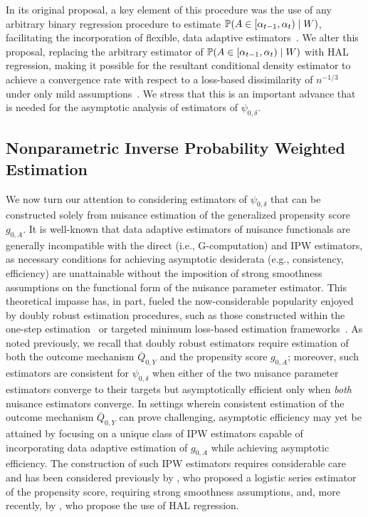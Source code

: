 In its original proposal, a key element of this procedure was the use of any
arbitrary binary regression procedure to estimate $\mathbb{P}(A \in [\alpha_{t-1},
\alpha_t) \mid W)$, facilitating the incorporation of flexible, data adaptive
estimators~\citep{diaz2011super}. We alter this proposal, replacing the
arbitrary estimator of $\mathbb{P}(A \in [\alpha_{t-1}, \alpha_t) \mid W)$ with HAL
regression, making it possible for the resultant conditional density estimator
to achieve a convergence rate with respect to a loss-based dissimilarity of
$n^{-1/3}$ under only mild assumptions~\citep{vdl2017generally, vdl2017uniform}.
We stress that this is an important advance that is needed for the asymptotic
analysis of estimators of $\psi_{0,\delta}$.

\subsection{Nonparametric Inverse Probability Weighted Estimation}\label{npipw}

We now turn our attention to considering estimators of $\psi_{0,\delta}$ that
can be constructed solely from nuisance estimation of the generalized propensity
score $g_{0,A}$. It is well-known that data adaptive estimators of nuisance
functionals are generally incompatible with the direct (i.e., G-computation) and
IPW estimators, as necessary conditions for achieving asymptotic desiderata
(e.g., consistency, efficiency) are unattainable without the imposition of
strong smoothness assumptions on the functional form of the nuisance parameter
estimator. This theoretical impasse has, in part, fueled the now-considerable
popularity enjoyed by doubly robust estimation procedures, such as those
constructed within the one-step estimation~\citep{bickel1993efficient} or
targeted minimum loss-based estimation frameworks~\citep{vdl2006targeted,
vdl2011targeted,vdl2018targeted}. As noted previously, we recall that doubly
robust estimators require estimation of both the outcome mechanism
$\overline{Q}_{0,Y}$ and the propensity score $g_{0,A}$; moreover, such
estimators are consistent for $\psi_{0,\delta}$ when either of the two nuisance
parameter estimators converge to their targets but asymptotically efficient only
when \textit{both} nuisance estimators converge. In settings wherein consistent
estimation of the outcome mechanism $\overline{Q}_{0,Y}$ can prove challenging,
asymptotic efficiency may yet be attained by focusing on a unique class of IPW
estimators capable of incorporating data adaptive estimation of $g_{0,A}$ while
achieving asymptotic efficiency. The construction of such IPW estimators
requires considerable care and has been considered previously by
\citet{hirano2003efficient}, who proposed a logistic series estimator of the
propensity score, requiring strong smoothness assumptions, and, more recently,
by \citet{ertefaie2020nonparametric}, who propose the use of HAL regression.

